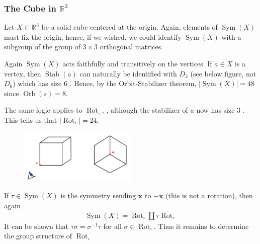 \documentclass{article}
\newcommand{\Stab}{\operatorname{Stab}}
\newcommand{\Orb}{\operatorname{Orb}}
\begin{document}
\subsubsection{The Cube in $\mathbb{R}^{3}$}
Let $X \subset \mathbb{R}^{3}$ be a solid cube centered at the origin. Again, elements of $\operatorname{Sym}(X)$ must fix the origin, hence, if we wished, we could identify $\operatorname{Sym}(X)$ with a subgroup of the group of $3 \times 3$ orthogonal matrices.

Again $\operatorname{Sym}(X)$ acts faithfully and transitively on the vertices. If $a \in X$ is a vertex, then  $\Stab(a)$ can naturally be identified with $D_{3}$ (see below figure, not $D_6$) which has size $6$ . Hence, by the Orbit-Stabilizer theorem, $|\operatorname{Sym}(X)|=48$ since $\Orb(s)=8$.

The same logic applies to $\operatorname{Rot}_{\square}$, , although the stabilizer of $a$ now has size 3 . This tells us that $\left|\operatorname{Rot}_{\square}\right|=24$.
\begin{figure}[h]
\centering
\includegraphics[width=0.5\textwidth]{Figs/cube1.png}
\end{figure}

If $\tau \in \operatorname{Sym}(X)$ is the symmetry sending $\boldsymbol{x}$ to $-\boldsymbol{x}$ (this is not a rotation), then again
\begin{align*}
\operatorname{Sym}(X)=\operatorname{Rot}_{\square} \coprod \tau\operatorname{Rot}_{\square}
\end{align*}
It can be shown that $\tau \sigma=\sigma^{-1} \tau$ for all $\sigma \in \operatorname{Rot}_{\square}$. Thus it remains to determine the group structure of $\operatorname{Rot}_{\square}$
\end{document}
